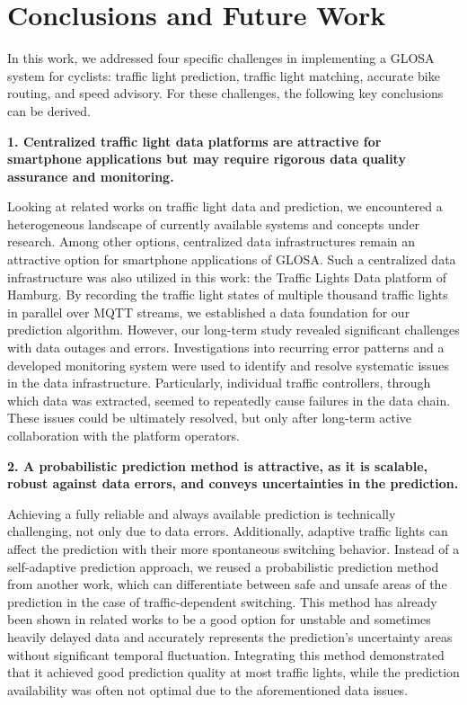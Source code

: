 \chapter{Conclusions and Future Work}\label{ch:conclusions}

In this work, we addressed four specific challenges in implementing a GLOSA system for cyclists: traffic light prediction, traffic light matching, accurate bike routing, and speed advisory. For these challenges, the following key conclusions can be derived.

\textbf{\color{cidarkblue}1. Centralized traffic light data platforms are attractive for smartphone applications but may require rigorous data quality assurance and monitoring.} 

Looking at related works on traffic light data and prediction, we encountered a heterogeneous landscape of currently available systems and concepts under research. Among other options, centralized data infrastructures remain an attractive option for smartphone applications of GLOSA. Such a centralized data infrastructure was also utilized in this work: the Traffic Lights Data platform of Hamburg. By recording the traffic light states of multiple thousand traffic lights in parallel over MQTT streams, we established a data foundation for our prediction algorithm. However, our long-term study revealed significant challenges with data outages and errors. Investigations into recurring error patterns and a developed monitoring system were used to identify and resolve systematic issues in the data infrastructure. Particularly, individual traffic controllers, through which data was extracted, seemed to repeatedly cause failures in the data chain. These issues could be ultimately resolved, but only after long-term active collaboration with the platform operators.

\textbf{\color{cidarkblue}2. A probabilistic prediction method is attractive, as it is scalable, robust against data errors, and conveys uncertainties in the prediction.} 

Achieving a fully reliable and always available prediction is technically challenging, not only due to data errors. Additionally, adaptive traffic lights can affect the prediction with their more spontaneous switching behavior. Instead of a self-adaptive prediction approach, we reused a probabilistic prediction method from another work, which can differentiate between safe and unsafe areas of the prediction in the case of traffic-dependent switching. This method has already been shown in related works to be a good option for unstable and sometimes heavily delayed data and accurately represents the prediction's uncertainty areas without significant temporal fluctuation. Integrating this method demonstrated that it achieved good prediction quality at most traffic lights, while the prediction availability was often not optimal due to the aforementioned data issues.


